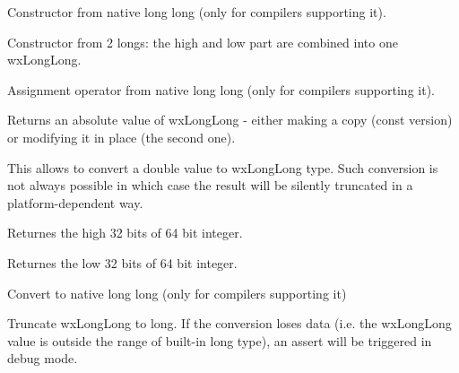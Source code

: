 Constructor from native long long (only for compilers supporting it).

\label{wxlonglongwxlonglong}


Constructor from 2 longs: the high and low part are combined into one
wxLongLong.

\label{wxlonglongoperatorassign}


Assignment operator from native long long (only for compilers supporting it).

\label{wxlonglongabs}



Returns an absolute value of wxLongLong - either making a copy (const version)
or modifying it in place (the second one).

\label{wxlonglongassign}


This allows to convert a double value to wxLongLong type. Such conversion is
not always possible in which case the result will be silently truncated in a
platform-dependent way.

\label{wxlonglonggethi}


Returnes the high 32 bits of 64 bit integer.

\label{wxlonglonggetlo}


Returnes the low 32 bits of 64 bit integer.

\label{wxlonglonggetvalue}


Convert to native long long (only for compilers supporting it)

\label{wxlonglongtolong}


Truncate wxLongLong to long. If the conversion loses data (i.e. the wxLongLong
value is outside the range of built-in long type), an assert will be triggered
in debug mode.

